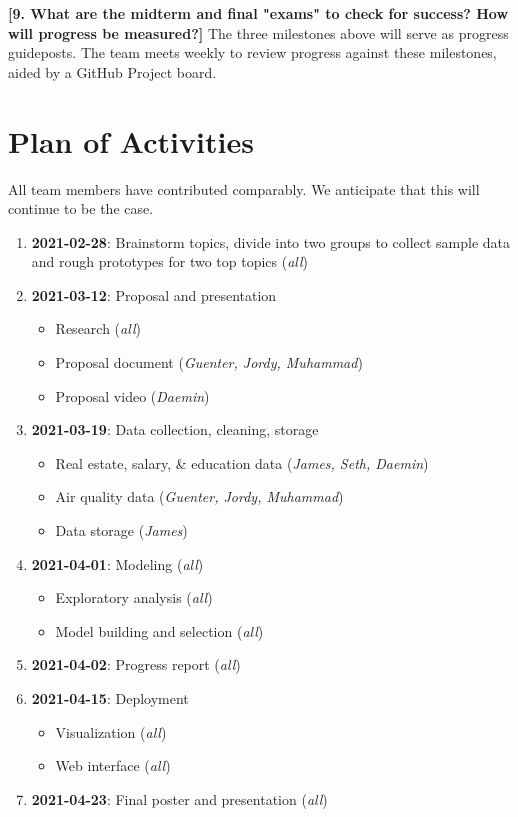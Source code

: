 \documentclass[sigconf,nonacm,11pt]{acmart}
\begin{document}
\textbf{[9. What are the midterm and final "exams" to check for success? How will progress be measured?]}
The three milestones above will serve as progress guideposts. The team meets weekly to review progress against these milestones, aided by a GitHub Project board.

\section{Plan of Activities}
All team members have contributed comparably. We anticipate that this will continue to be the case.
\begin{enumerate}
  \item{\textbf{2021-02-28}: Brainstorm topics, divide into two groups to collect sample data and rough prototypes for two top topics (\textit{all})}
  \item{\textbf{2021-03-12}: Proposal and presentation}
  \begin{itemize}
    \item{Research (\textit{all})}
    \item{Proposal document (\textit{Guenter, Jordy, Muhammad})}
    \item{Proposal video (\textit{Daemin})}
  \end{itemize}
  \item{\textbf{2021-03-19}: Data collection, cleaning, storage}
  \begin{itemize}
    \item{Real estate, salary, \& education data (\textit{James, Seth, Daemin})}
    \item{Air quality data (\textit{Guenter, Jordy, Muhammad})}
    \item{Data storage (\textit{James})}
  \end{itemize}
  \item{\textbf{2021-04-01}: Modeling (\textit{all})}
  \begin{itemize}
    \item{Exploratory analysis (\textit{all})}
    \item{Model building and selection (\textit{all})}
  \end{itemize}
  \item{\textbf{2021-04-02}: Progress report (\textit{all})}
  \item{\textbf{2021-04-15}: Deployment}
  \begin{itemize}
    \item{Visualization (\textit{all})}
    \item{Web interface (\textit{all})}
  \end{itemize}
  \item{\textbf{2021-04-23}: Final poster and presentation (\textit{all})}
\end{enumerate}
\end{document}
